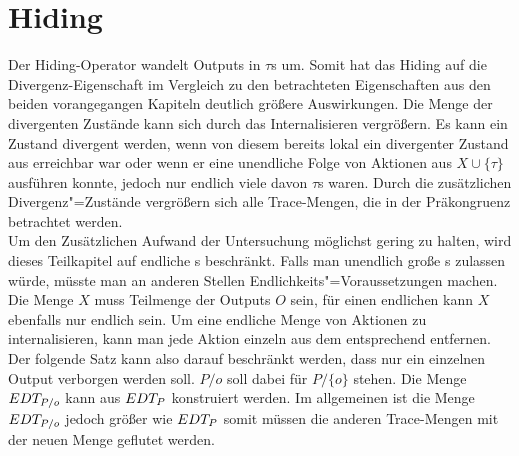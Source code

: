 \section{Hiding}

Der Hiding-Operator wandelt Outputs in $\tau$s um. Somit hat das Hiding auf die
Divergenz-Eigenschaft im Vergleich zu den betrachteten Eigenschaften aus den
beiden vorangegangen Kapiteln deutlich größere Auswirkungen. Die Menge der
divergenten Zustände kann sich durch das Internalisieren vergrößern. Es kann
ein Zustand divergent werden, wenn von diesem bereits lokal ein divergenter
Zustand aus erreichbar war oder wenn er eine unendliche Folge von Aktionen aus
$X\cup \{\tau\}$ ausführen konnte, jedoch nur endlich viele davon $\tau$s
waren. Durch die zusätzlichen Divergenz"=Zustände vergrößern sich alle
Trace-Mengen, die in der Präkongruenz \DRel{} betrachtet werden.\\
Um den Zusätzlichen Aufwand der Untersuchung möglichst gering zu halten, wird
dieses Teilkapitel auf endliche \MEIO{}s beschränkt. Falls man unendlich große
\MEIO{}s zulassen würde, müsste man an anderen Stellen
Endlichkeits"=Voraussetzungen machen.\\
Die Menge $X$ muss Teilmenge der Outputs $O$ sein, für einen endlichen \MEIO{}
kann $X$ ebenfalls nur endlich sein. Um eine endliche Menge von Aktionen zu
internalisieren, kann man jede Aktion einzeln aus dem entsprechend \MEIO{}
entfernen. Der folgende Satz kann also darauf beschränkt werden, dass nur ein
einzelnen Output verborgen werden soll. $P/o$ soll dabei für $P/\{o\}$ stehen.
Die Menge $EDT _{P/o}$ kann aus $EDT _P$ konstruiert werden. Im allgemeinen
ist die Menge $EDT _{P/o}$ jedoch größer wie $EDT _P$ somit müssen die
anderen Trace-Mengen mit der neuen Menge geflutet werden.


